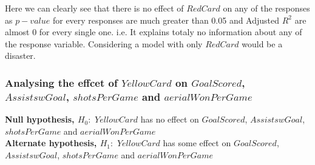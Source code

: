 \documentclass[12pt]{article}
\begin{document}
Here we can clearly see that there is no effect of $ RedCard $ on any of the responses as $ p-value $ for every responses are much greater than 0.05 and  Adjusted $R^2 $ are almost 0 for every single one. i.e. It explains totaly no information about any of the response variable. Considering a model with only $ RedCard $ would be a disaster.

\newpage

\subsubsection{Analysing the effcet of $ YellowCard $ on $ GoalScored $, \\ $ AssistswGoal $, $ shotsPerGame $ and $ aerialWonPerGame $}

\textbf{Null hypothesis, $ H_0: $} $ YellowCard $ has no effect on $ GoalScored $, $ AssistswGoal $, $ shotsPerGame $ and $ aerialWonPerGame $\\
\textbf{Alternate hypothesis, $ H_1: $} $ YellowCard $ has some effect on $ GoalScored $, $ AssistswGoal $, $ shotsPerGame $ and $ aerialWonPerGame $
\end{document}
